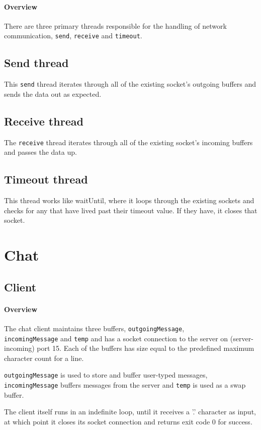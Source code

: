 \documentclass[]{article}
\begin{document}
\paragraph{Overview}
There are three primary threads responsible for the handling of network communication, \texttt{send}, \texttt{receive} and \texttt{timeout}.

\subsection{Send thread}
This \texttt{send} thread iterates through all of the existing socket's outgoing buffers and sends the data out as expected.
\subsection{Receive thread}
The \texttt{receive} thread iterates through all of the existing socket's incoming buffers and passes the data up.
\subsection{Timeout thread}
This thread works like waitUntil, where it loops through the existing sockets and checks for any that have lived past their timeout value. If they have, it closes that socket.

\section{Chat}
\subsection{Client}
\paragraph{Overview} The chat client maintains three buffers, \texttt{outgoingMessage}, \\ \texttt{incomingMessage} and \texttt{temp} and has a socket connection to the server on (server-incoming) port 15. Each of the buffers has size equal to the predefined maximum character count for a line.

\texttt{outgoingMessage} is used to store and buffer user-typed messages, \\ \texttt{incomingMessage} buffers messages from the server and \texttt{temp} is used as a swap buffer.

The client itself runs in an indefinite loop, until it receives a '.' character as input, at which point it closes its socket connection and returns exit code 0 for success. 
\end{document}
